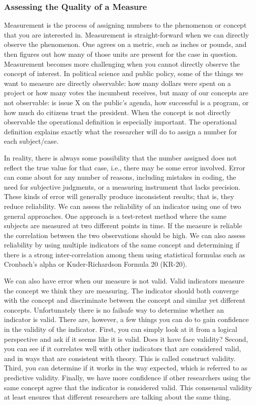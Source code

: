 \documentclass[11pt,openany]{book}\usepackage[]{graphicx}\usepackage[]{color}
\begin{document}
\subsubsection{Assessing the Quality of a Measure}
Measurement is the process of assigning numbers to the phenomenon or concept that you are interested in. Measurement is straight-forward when we can directly observe the phenomenon. One agrees on a metric, such as inches or pounds, and then figures out how many of those units are present for the case in question. Measurement becomes more challenging when you cannot directly observe the concept of interest. In political science and public policy, some of the things we want to measure are directly observable: how many dollars were spent on a project or how many votes the incumbent receives, but many of our concepts are not observable: is issue X on the public's agenda, how successful is a program, or how much do citizens trust the president. When the concept is not directly observable the operational definition is especially important. The operational definition explains exactly what the researcher will do to assign a number for each subject/case. 

In reality, there is always some possibility that the number assigned does not reflect the true value for that case, i.e., there may be some error involved. Error can come about for any number of reasons, including mistakes in coding, the need for subjective judgments, or a measuring instrument that lacks precision. These kinds of error will generally produce inconsistent results; that is, they reduce reliability. We can assess the reliability of an indicator using one of two general approaches. One approach is a test-retest method where the same subjects are measured at two different points in time. If the measure is reliable the correlation between the two observations should be high. We can also assess reliability by using multiple indicators of the same concept and determining if there is a strong inter-correlation among them using statistical formulas such as Cronbach's alpha or Kuder-Richardson Formula 20 (KR-20).

We can also have error when our measure is not valid. Valid indicators measure the concept we think they are measuring. The indicator should both converge with the concept and discriminate between the concept and similar yet different concepts. Unfortunately there is no failsafe way to determine whether an indicator is valid. There are, however, a few things you can do to gain confidence in the validity of the indicator. First, you can simply look at it from a logical perspective and ask if it seems like it is valid. Does it have face validity?  Second, you can see if it correlates well with other indicators that are considered valid, and in ways that are consistent with theory. This is called construct validity. Third, you can determine if it works in the way expected, which is referred to as predictive validity. Finally, we have more confidence if 
other researchers using the same concept agree that the indicator is considered valid. This consensual validity at least ensures that different researchers are talking about the same thing.
\end{document}
